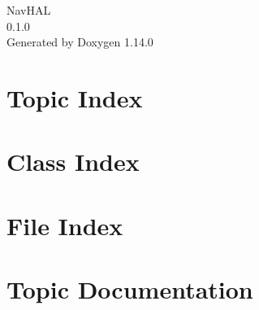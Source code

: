 \documentclass[twoside]{book}
\newcommand{\+}{\discretionary{\mbox{\scriptsize$\hookleftarrow$}}{}{}}
\newcommand{\clearemptydoublepage}{%
    \newpage{\pagestyle{empty}\cleardoublepage}%
  }
\begin{document}
  \raggedbottom
    \hypersetup{pageanchor=false,
                bookmarksnumbered=true,
                pdfencoding=unicode
               }
  \begin{titlepage}
  \vspace*{7cm}
  \begin{center}%
  {\Large Nav\+HAL}\\
  [1ex]\large 0.\+1.\+0 \\
  \vspace*{1cm}
  {\large Generated by Doxygen 1.14.0}\\
  \end{center}
  \end{titlepage}
  \clearemptydoublepage
  \tableofcontents
  \clearemptydoublepage
  \hypersetup{pageanchor=true}















\chapter{Topic Index}

\chapter{Class Index}

\chapter{File Index}

\chapter{Topic Documentation}




\end{document}
